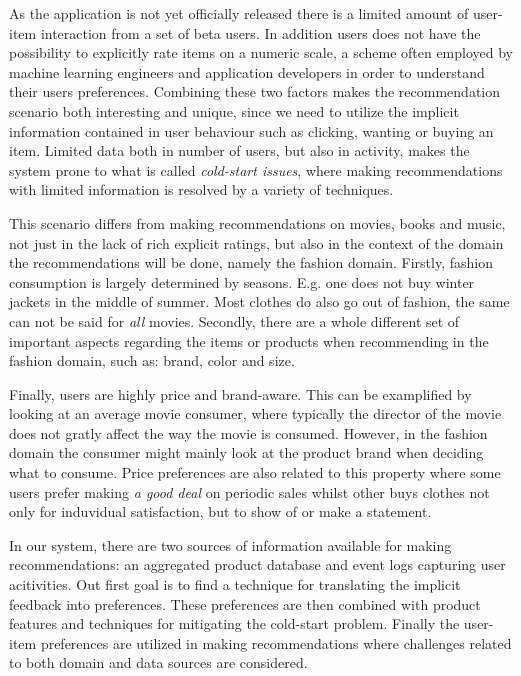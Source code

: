 As the application is not yet officially released there is a limited amount of
user-item interaction from a set of beta users. In addition users does not have
the possibility to explicitly rate items on a numeric scale, a scheme often
employed by machine learning engineers and application developers in order to
understand their users preferences. Combining these two factors makes the
recommendation scenario both interesting and unique, since we need to utilize
the implicit information contained in user behaviour such as clicking, wanting
or buying an item. Limited data both in number of users, but also in activity,
makes the system prone to what is called \textit{cold-start issues}, where
making recommendations with limited information is resolved by a variety of
techniques.

This scenario differs from making recommendations on movies, books and music,
not just in the lack of rich explicit ratings, but also in the context of the
domain the recommendations will be done, namely the fashion domain. Firstly,
fashion consumption is largely determined by seasons. E.g. one does not buy
winter jackets in the middle of summer. Most clothes do also go out of
fashion, the same can not be said for \emph{all} movies. Secondly, there are a
whole different set of important aspects regarding the items or products when
recommending in the fashion domain, such as: brand, color and size. 

Finally, users are highly price and brand-aware. This can be examplified by
looking at an average movie consumer, where typically the director of the movie
does not gratly affect the way the movie is consumed. However, in the fashion
domain the consumer might mainly look at the product brand when deciding what
to consume. Price preferences are also related to this property where some
users prefer making \textit{a good deal} on periodic sales whilst other buys
clothes not only for induvidual satisfaction, but to show of or make a
statement.

In our system, there are two sources of information available for making
recommendations: an aggregated product database and event logs capturing user
acitivities. Out first goal is to find a technique for translating the implicit
feedback into preferences. These preferences are then combined with product
features and techniques for mitigating the cold-start problem. Finally the
user-item preferences are utilized in making recommendations where challenges
related to both domain and data sources are considered.

